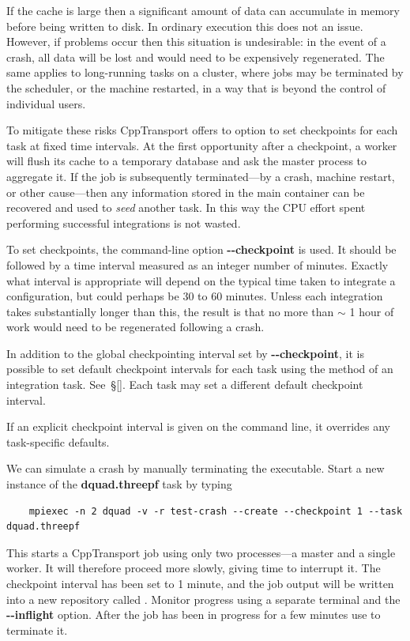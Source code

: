 \documentclass[11pt,a4paper]{article}
\renewcommand{\texttt}[1]{{\ttfamily\fontseries{l}\selectfont{#1}}}
\newcounter{advancedbox}[section]
\newenvironment{advanced}[1]{\stepcounter{advancedbox}\begin{tcolorbox}[enhanced,breakable,colback=red!10,colbacktitle=red!20,colframe=red!40,coltitle=black,title={Advanced usage: {#1}},fonttitle=\sffamily\fontseries{b}\selectfont]}{\end{tcolorbox}}
\newcommand{\repoobject}[1]{{\ttfamily\bfseries\small #1}}
\newcommand{\packagefont}{\sffamily}
\newcommand{\CppTransport}{{\packagefont CppTransport}}
\newcommand{\file}[1]{\texttt{{#1}}}
\newcommand{\option}[1]{{\ttfamily\bfseries\small #1}}
\newcommand{\semibold}[1]{{\fontseries{b}\selectfont{#1}}}
\newcommand{\para}[1]{\par\vspace{2mm}\noindent\semibold{{#1.}---}\ignorespaces}
\begin{document}
If the cache is large then a significant amount of data can
accumulate in memory before being written to disk.
In ordinary execution this does not an issue.
However, if problems occur then this situation is
undesirable:
in the event of a crash, all data will be lost
and would need to be expensively regenerated.
The same applies to long-running tasks on a cluster,
where jobs may be terminated by the scheduler,
or the machine restarted,
in a way that is beyond the control of individual users.

To mitigate these risks {\CppTransport} offers to option
to set checkpoints for each task
at fixed time intervals.
At the first opportunity after a checkpoint,
a worker will flush its cache to a temporary database
and ask the master process to aggregate it.
If the job is subsequently terminated---by a crash,
machine restart, or other cause---then any information
stored in the main container can be recovered
and used to \emph{seed} another task.
In this way the CPU effort spent performing successful
integrations is not wasted.

To set checkpoints, the command-line option
\option{{-}{-}checkpoint} is used. It should be followed
by a time interval measured as an integer number of minutes.
Exactly what interval is appropriate will depend on the
typical time taken to integrate a configuration,
but could perhaps be 30 to 60 minutes.
Unless each integration takes substantially longer
than this, the result is that no more than $\sim$ 1 hour
of work would need to be regenerated following a crash.

\begin{advanced}{Setting default checkpoints for a task}
    In addition to the global checkpointing interval set by
    \option{{-}{-}checkpoint}, it is possible to set default
    checkpoint intervals for each task
    using the \texttt{set_default_checkpoint()}
    method of an integration task. See~\S\ref{}.
    Each task may set a different default checkpoint interval.
    
    If an explicit checkpoint interval is given on the
    command line, it overrides
    any task-specific defaults.
\end{advanced}

\para{Example}
We can simulate a crash by manually terminating
the \file{dquad} executable.
Start a new instance of the
\repoobject{dquad.threepf} task by typing
\begin{verbatim}
    mpiexec -n 2 dquad -v -r test-crash --create --checkpoint 1 --task dquad.threepf
\end{verbatim}
This starts a {\CppTransport} job using only two
processes---a master and a single worker. It will therefore proceed
more slowly, giving time to interrupt it.
The checkpoint interval has been set to 1 minute, and
the job output will be written into a new repository called
\file{test-crash}.
Monitor progress using a separate terminal and the
\option{{-}{-}inflight} option.
After the job has been in progress for a few minutes use
\texttt{Ctrl-C}
to terminate it.
\end{document}
